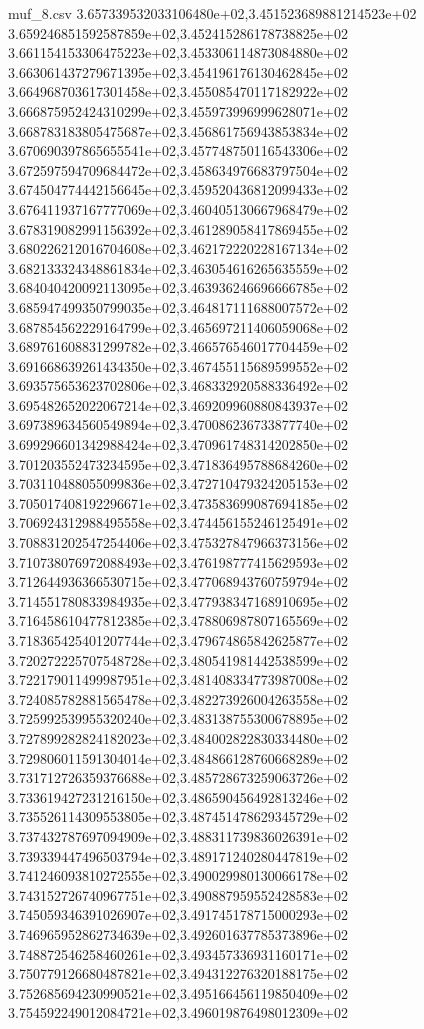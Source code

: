 \begin{filecontents*}{muf_8.csv}
3.657339532033106480e+02,3.451523689881214523e+02
3.659246851592587859e+02,3.452415286178738825e+02
3.661154153306475223e+02,3.453306114873084880e+02
3.663061437279671395e+02,3.454196176130462845e+02
3.664968703617301458e+02,3.455085470117182922e+02
3.666875952424310299e+02,3.455973996999628071e+02
3.668783183805475687e+02,3.456861756943853834e+02
3.670690397865655541e+02,3.457748750116543306e+02
3.672597594709684472e+02,3.458634976683797504e+02
3.674504774442156645e+02,3.459520436812099433e+02
3.676411937167777069e+02,3.460405130667968479e+02
3.678319082991156392e+02,3.461289058417869455e+02
3.680226212016704608e+02,3.462172220228167134e+02
3.682133324348861834e+02,3.463054616265635559e+02
3.684040420092113095e+02,3.463936246696666785e+02
3.685947499350799035e+02,3.464817111688007572e+02
3.687854562229164799e+02,3.465697211406059068e+02
3.689761608831299782e+02,3.466576546017704459e+02
3.691668639261434350e+02,3.467455115689599552e+02
3.693575653623702806e+02,3.468332920588336492e+02
3.695482652022067214e+02,3.469209960880843937e+02
3.697389634560549894e+02,3.470086236733877740e+02
3.699296601342988424e+02,3.470961748314202850e+02
3.701203552473234595e+02,3.471836495788684260e+02
3.703110488055099836e+02,3.472710479324205153e+02
3.705017408192296671e+02,3.473583699087694185e+02
3.706924312988495558e+02,3.474456155246125491e+02
3.708831202547254406e+02,3.475327847966373156e+02
3.710738076972088493e+02,3.476198777415629593e+02
3.712644936366530715e+02,3.477068943760759794e+02
3.714551780833984935e+02,3.477938347168910695e+02
3.716458610477812385e+02,3.478806987807165569e+02
3.718365425401207744e+02,3.479674865842625877e+02
3.720272225707548728e+02,3.480541981442538599e+02
3.722179011499987951e+02,3.481408334773987008e+02
3.724085782881565478e+02,3.482273926004263558e+02
3.725992539955320240e+02,3.483138755300678895e+02
3.727899282824182023e+02,3.484002822830334480e+02
3.729806011591304014e+02,3.484866128760668289e+02
3.731712726359376688e+02,3.485728673259063726e+02
3.733619427231216150e+02,3.486590456492813246e+02
3.735526114309553805e+02,3.487451478629345729e+02
3.737432787697094909e+02,3.488311739836026391e+02
3.739339447496503794e+02,3.489171240280447819e+02
3.741246093810272555e+02,3.490029980130066178e+02
3.743152726740967751e+02,3.490887959552428583e+02
3.745059346391026907e+02,3.491745178715000293e+02
3.746965952862734639e+02,3.492601637785373896e+02
3.748872546258460261e+02,3.493457336931160171e+02
3.750779126680487821e+02,3.494312276320188175e+02
3.752685694230990521e+02,3.495166456119850409e+02
3.754592249012084721e+02,3.496019876498012309e+02

\end{filecontents*}
